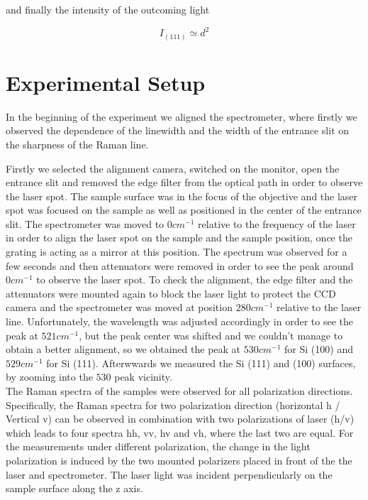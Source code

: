 \documentclass[openany,11pt,a4paper]{report}
\begin{document}
and finally the intensity of the outcoming light

\begin{equation}
I_{(111)} \simeq d^{2}
\end{equation}













\chapter{Experimental Setup}

In the beginning of the experiment we  aligned the spectrometer, where firstly we observed the dependence of the linewidth and the width of the entrance slit on the sharpness of the Raman line.\


Firstly we selected the alignment camera, switched on the monitor, open the entrance slit and removed the edge filter from the optical path in order to observe the laser spot. The sample surface was in the focus of the objective and the laser spot was focused on the sample as well as positioned in the center of the entrance slit. The spectrometer was moved to $0 cm^{-1}$ relative to the frequency of the laser in order to align the laser spot on the sample and the sample position, once the grating is acting as a mirror at this position. The spectrum was observed for a few seconds and then attenuators were removed in order to see the peak around $0 cm^{-1}$ to observe the laser spot.  To check the alignment, the edge filter and the attenuators were mounted again to block the laser light to protect the CCD camera and the spectrometer was moved at position $280 cm^{-1}$ relative to the laser line. Unfortunately, the wavelength was adjusted accordingly in order to see the peak at $521cm^{-1}$, but the peak center was shifted and we couldn't manage to obtain a better alignment, so we obtained the peak at $530cm^{-1}$ for Si (100) and $529cm^{-1}$ for Si (111). Afterwwards we measured the Si (111) and (100) surfaces, by zooming into the $530$ peak vicinity.\\

The Raman spectra of the samples were observed for all polarization directions. Specifically, the Raman spectra for two polarization direction (horizontal h / Vertical v) can be observed in combination with two polarizations of laser (h/v) which leads to four spectra hh, vv, hv and vh, where  the last two are equal. For the measurements under different polarization, the change in the light polarization is induced by the two mounted polarizers placed in front of the the laser and spectrometer. The laser light was incident perpendicularly on the sample surface along the z axis.
\end{document}
